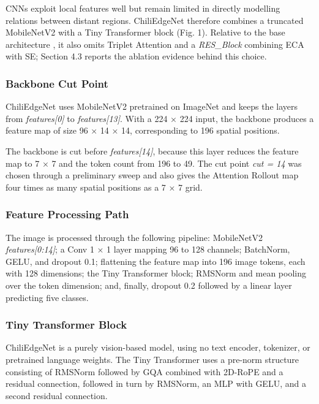 CNNs exploit local features well but remain limited in directly modelling relations between distant regions. ChiliEdgeNet therefore combines a truncated MobileNetV2 with a Tiny Transformer block (Fig. 1). Relative to the base architecture \cite{duhan2025}, it also omits Triplet Attention \cite{misra2021} and a \emph{RES\_Block} combining ECA with SE; Section 4.3 reports the ablation evidence behind this choice.

\subsubsection{Backbone Cut Point}\label{backbone-cut-point}

ChiliEdgeNet uses MobileNetV2 pretrained on ImageNet and keeps the layers from \emph{features{[}0{]}} to \emph{features{[}13{]}}. With a 224 × 224 input, the backbone produces a feature map of size 96 × 14 × 14, corresponding to 196 spatial positions.

The backbone is cut before \emph{features{[}14{]}}, because this layer reduces the feature map to 7 × 7 and the token count from 196 to 49. The cut point \emph{cut = 14} was chosen through a preliminary sweep and also gives the Attention Rollout map four times as many spatial positions as a 7 × 7 grid.

\subsubsection{Feature Processing Path}\label{feature-processing-path}

The image is processed through the following pipeline: MobileNetV2 \emph{features{[}0:14{]}}; a Conv 1 × 1 layer mapping 96 to 128 channels; BatchNorm, GELU, and dropout 0.1; flattening the feature map into 196 image tokens, each with 128 dimensions; the Tiny Transformer block; RMSNorm and mean pooling over the token dimension; and, finally, dropout 0.2 followed by a linear layer predicting five classes.

\subsubsection{Tiny Transformer Block}\label{tiny-transformer-block}

ChiliEdgeNet is a purely vision-based model, using no text encoder, tokenizer, or pretrained language weights. The Tiny Transformer uses a pre-norm structure consisting of RMSNorm followed by GQA combined with 2D-RoPE and a residual connection, followed in turn by RMSNorm, an MLP with GELU, and a second residual connection.

